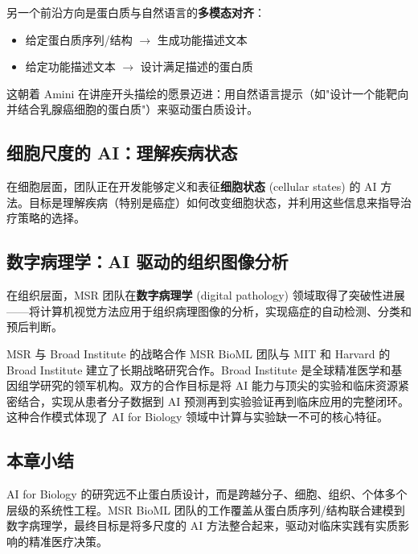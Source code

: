 另一个前沿方向是蛋白质与自然语言的\textbf{多模态对齐}：

\begin{itemize}
    \item 给定蛋白质序列/结构 $\rightarrow$ 生成功能描述文本
    \item 给定功能描述文本 $\rightarrow$ 设计满足描述的蛋白质
\end{itemize}

这朝着 Amini 在讲座开头描绘的愿景迈进：用自然语言提示（如"设计一个能靶向并结合乳腺癌细胞的蛋白质"）来驱动蛋白质设计。

\subsection{细胞尺度的 AI：理解疾病状态}

在细胞层面，团队正在开发能够定义和表征\textbf{细胞状态} (cellular states) 的 AI 方法。目标是理解疾病（特别是癌症）如何改变细胞状态，并利用这些信息来指导治疗策略的选择。

\subsection{数字病理学：AI 驱动的组织图像分析}

在组织层面，MSR 团队在\textbf{数字病理学} (digital pathology) 领域取得了突破性进展——将计算机视觉方法应用于组织病理图像的分析，实现癌症的自动检测、分类和预后判断。

\begin{knowledgebox}{MSR 与 Broad Institute 的战略合作}
MSR BioML 团队与 MIT 和 Harvard 的 Broad Institute 建立了长期战略研究合作。Broad Institute 是全球精准医学和基因组学研究的领军机构。双方的合作目标是将 AI 能力与顶尖的实验和临床资源紧密结合，实现从患者分子数据到 AI 预测再到实验验证再到临床应用的完整闭环。这种合作模式体现了 AI for Biology 领域中计算与实验缺一不可的核心特征。
\end{knowledgebox}

\subsection{本章小结}

AI for Biology 的研究远不止蛋白质设计，而是跨越分子、细胞、组织、个体多个层级的系统性工程。MSR BioML 团队的工作覆盖从蛋白质序列/结构联合建模到数字病理学，最终目标是将多尺度的 AI 方法整合起来，驱动对临床实践有实质影响的精准医疗决策。


